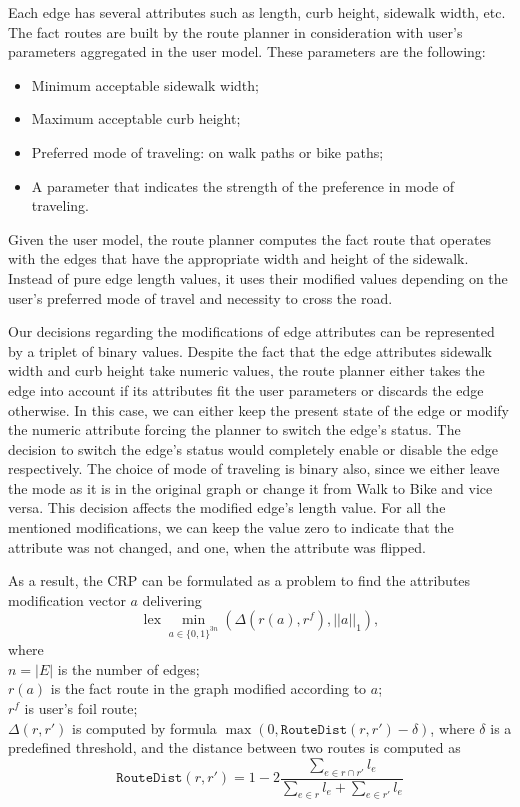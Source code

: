 \documentclass{article}
\DeclareMathOperator{\lex}{lex}
\begin{document}
Each edge has several attributes such as length, curb height, sidewalk width, etc. 
The fact routes are built by the route planner in consideration with user's parameters aggregated in the user model. 
These parameters are the following: 
\begin{itemize}
    \item Minimum acceptable sidewalk width;
    \item Maximum acceptable curb height;
    \item Preferred mode of traveling: on walk paths or bike paths;
    \item A parameter that indicates the strength of the preference in mode of traveling.
\end{itemize}
Given the user model, the route planner computes the fact route that operates with the edges that have the appropriate width and height of the sidewalk.
Instead of pure edge length values, it uses their modified values depending on the user's preferred mode of travel and necessity to cross the road.

Our decisions regarding the modifications of edge attributes can be represented by a triplet of binary values.
Despite the fact that the edge attributes sidewalk width and curb height take numeric values, the route planner either takes the edge into account if its attributes fit the user parameters or discards the edge otherwise. 
In this case, we can either keep the present state of the edge or modify the numeric attribute forcing the planner to switch the edge's status.
The decision to switch the edge's status would completely enable or disable the edge respectively.
The choice of mode of traveling is binary also, since we either leave the mode as it is in the original graph or change it from Walk to Bike and vice versa.
This decision affects the modified edge's length value.
For all the mentioned modifications, we can keep the value zero to indicate that the attribute was not changed, and one, when the attribute was flipped. 

As a result, the CRP can be formulated as a problem to find the attributes modification vector $a$ delivering $$\lex\min_{a\in \{0,1\}^{3n}} \left(\Delta(r(a), r^f), ||a||_1\right),$$ where\\
$n = |E|$ is the number of edges;\\
$r(a)$ is the fact route in the graph modified according to $a$;\\
$r^f$ is user's foil route;\\
$\Delta(r,r')$ is computed by formula $\max(0, \mathtt{RouteDist}(r, r') - \delta)$, where $\delta$ is a predefined threshold, and the distance between two routes is computed as
$$
\mathtt{RouteDist}(r,r') = 1 - 2\frac{\sum_{e\in r\cap r'} l_e}{\sum_{e\in r}l_e + \sum_{e\in r'} l_e}
$$
\end{document}
